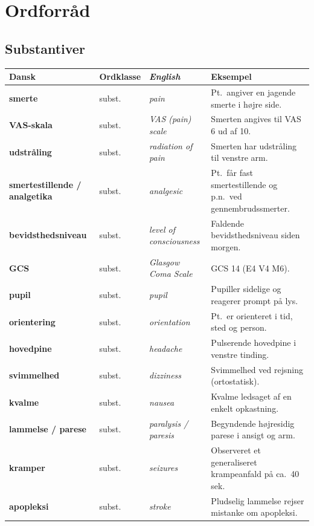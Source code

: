\documentclass[11pt,a4paper]{report}
\makeatletter
\newcommand{\eng}[1]{\textcolor{en}{\itshape #1}}       %
\newcommand{\da}[1]{\textbf{#1}}
\newenvironment{glos}{%
  \small\renewcommand{\arraystretch}{1.35}
  \begin{longtable}{@{}>{\raggedright\arraybackslash}p{3.3cm}
                        >{\raggedright\arraybackslash}p{1.7cm}
                        >{\raggedright\arraybackslash}p{3.2cm}
                        >{\raggedright\arraybackslash}p{6.0cm}@{}}
  \toprule
  \textbf{Dansk} & \textbf{Ordklasse} & \eng{English} & \textbf{Eksempel} \\ \midrule
  \endhead
}{\bottomrule\end{longtable}}
\makeatother
\begin{document}
\section{Ordforråd}
\subsection{Substantiver}
\begin{glos}
\da{smerte} & subst. & \eng{pain} & Pt.\ angiver en jagende smerte i højre side. \\
\da{VAS-skala} & subst. & \eng{VAS (pain) scale} & Smerten angives til VAS 6 ud af 10. \\
\da{udstråling} & subst. & \eng{radiation of pain} & Smerten har udstråling til venstre arm. \\
\da{smertestillende / analgetika} & subst. & \eng{analgesic} & Pt.\ får fast smertestillende og p.n.\ ved gennembrudssmerter. \\
\da{bevidsthedsniveau} & subst. & \eng{level of consciousness} & Faldende bevidsthedsniveau siden morgen. \\
\da{GCS} & subst. & \eng{Glasgow Coma Scale} & GCS 14 (E4 V4 M6). \\
\da{pupil} & subst. & \eng{pupil} & Pupiller sidelige og reagerer prompt på lys. \\
\da{orientering} & subst. & \eng{orientation} & Pt.\ er orienteret i tid, sted og person. \\
\da{hovedpine} & subst. & \eng{headache} & Pulserende hovedpine i venstre tinding. \\
\da{svimmelhed} & subst. & \eng{dizziness} & Svimmelhed ved rejsning (ortostatisk). \\
\da{kvalme} & subst. & \eng{nausea} & Kvalme ledsaget af en enkelt opkastning. \\
\da{lammelse / parese} & subst. & \eng{paralysis / paresis} & Begyndende højresidig parese i ansigt og arm. \\
\da{kramper} & subst. & \eng{seizures} & Observeret et generaliseret krampeanfald på ca.\ 40 sek. \\
\da{apopleksi} & subst. & \eng{stroke} & Pludselig lammelse rejser mistanke om apopleksi. \\
\end{glos}
\end{document}
